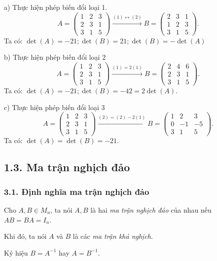 a) Thực hiện phép biến đổi loại 1.
\[
A = \begin{pmatrix}
1 & 2 & 3 \\
2 & 3 & 1 \\
3 & 1 & 5
\end{pmatrix} \xrightarrow{(1) \leftrightarrow (2)} B = \begin{pmatrix}
2 & 3 & 1 \\
1 & 2 & 3 \\
3 & 1 & 5
\end{pmatrix}.
\]
Ta có: \(\det(A) = -21; \det(B) = 21; \det(B) = -\det(A)\)

b) Thực hiện phép biến đổi loại 2
\[
A = \begin{pmatrix}
1 & 2 & 3 \\
2 & 3 & 1 \\
3 & 1 & 5
\end{pmatrix} \xrightarrow{(1)=2(1)} B = \begin{pmatrix}
2 & 4 & 6 \\
2 & 3 & 1 \\
3 & 1 & 5
\end{pmatrix}.
\]
Ta có: \(\det(A) = -21; \det(B) = -42 = 2\det(A)\).

c) Thực hiện phép biến đổi loại 3
\[
A = \begin{pmatrix}
1 & 2 & 3 \\
2 & 3 & 1 \\
3 & 1 & 5
\end{pmatrix} \xrightarrow{(2)=(2)-2(1)} B = \begin{pmatrix}
1 & 2 & 3 \\
0 & -1 & -5 \\
3 & 1 & 5
\end{pmatrix}.
\]
Ta có: \(\det(A) = \det(B) = -21\).

\subsection*{1.3. Ma trận nghịch đảo}

\subsubsection*{3.1. Định nghĩa ma trận nghịch đảo}
Cho \( A, B \in M_n \), ta nói \( A, B \) là hai \textit{ma trận nghịch đảo} của nhau nếu \( AB = BA = I_n \).

Khi đó, ta nói \( A \) và \( B \) là các \textit{ma trận khả nghịch}.

Ký hiệu \( B = A^{-1} \) hay \( A = B^{-1} \).

